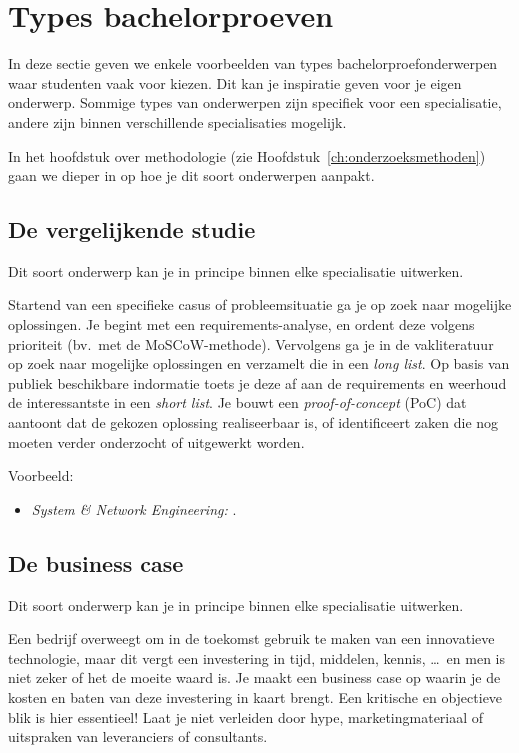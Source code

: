 \section{Types bachelorproeven}%
\label{sec:onderwerp_types}

In deze sectie geven we enkele voorbeelden van types bachelorproefonderwerpen waar studenten vaak voor kiezen. Dit kan je inspiratie geven voor je eigen onderwerp. Sommige types van onderwerpen zijn specifiek voor een specialisatie, andere zijn binnen verschillende specialisaties mogelijk.

In het hoofdstuk over methodologie (zie Hoofdstuk~\ref{ch:onderzoeksmethoden}) gaan we dieper in op hoe je dit soort onderwerpen aanpakt.

\subsection{De vergelijkende studie}%
\label{ssec:onderwerp_types_vergelijkende_studie}

Dit soort onderwerp kan je in principe binnen elke specialisatie uitwerken.

Startend van een specifieke casus of probleemsituatie ga je op zoek naar mogelijke oplossingen. Je begint met een requirements-analyse, en ordent deze volgens prioriteit (bv.\ met de MoSCoW-methode). Vervolgens ga je in de vakliteratuur op zoek naar mogelijke oplossingen en verzamelt die in een \emph{long list}. Op basis van publiek beschikbare indormatie toets je deze af aan de requirements en weerhoud de interessantste in een \emph{short list}. Je bouwt een \emph{proof-of-concept} (PoC) dat aantoont dat de gekozen oplossing realiseerbaar is, of identificeert zaken die nog moeten verder onderzocht of uitgewerkt worden.

Voorbeeld:

\begin{itemize}
  \item \emph{System \& Network Engineering:}  \autocite{VanDamme2021}.
\end{itemize}

\subsection{De business case}%
\label{ssec:onderwerp_types_business_case}

Dit soort onderwerp kan je in principe binnen elke specialisatie uitwerken.

Een bedrijf overweegt om in de toekomst gebruik te maken van een innovatieve technologie, maar dit vergt een investering in tijd, middelen, kennis, \ldots\ en men is niet zeker of het de moeite waard is. Je maakt een business case op waarin je de kosten en baten van deze investering in kaart brengt. Een kritische en objectieve blik is hier essentieel! Laat je niet verleiden door hype, marketingmateriaal of uitspraken van leveranciers of consultants.

